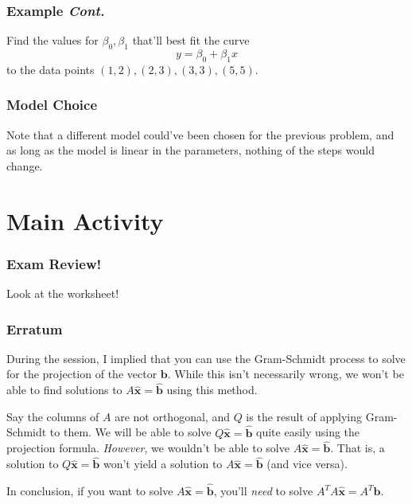 \documentclass{beamer}
\renewcommand{\vec}[1]{\mathbf{#1}}
\begin{document}
	\begin{frame}
		\frametitle{Example \textit{Cont.}}
		Find the values for \(\beta_0, \beta_1\) that'll best fit the curve \[y = \beta_0 + \beta_1 x\] to the data points \((1, 2), (2, 3), (3, 3), (5, 5)\).
		\begin{figure}[!h]
		\end{figure}
	\end{frame}

	\begin{frame}
		\frametitle{Model Choice}
		Note that a different model could've been chosen for the previous problem, and as long as the model is linear in the parameters, nothing of the steps would change.
	\end{frame}

	\section{Main Activity}
	\begin{frame}
		\frametitle{Exam Review!}
		Look at the worksheet!
	\end{frame}

	\begin{frame}
		\frametitle{Erratum}
		During the session, I implied that you can use the Gram-Schmidt process to solve for the projection of the vector \(\vec{b}.\) While this isn't 
		necessarily wrong, we won't be able to find solutions to \(A\vec{\hat{x}} = \vec{\hat{b}}\) using this method. 
		
		Say the columns of \(A\) are not orthogonal, and \(Q\) is the result of applying Gram-Schmidt to them. We will be able to solve 
		\(Q\vec{\hat{x}} = \vec{\hat{b}}\) quite easily using the projection formula. \emph{However}, we wouldn't be able to solve 
		\(A\vec{\hat{x}} = \vec{\hat{b}}\). That is, a solution to \(Q\vec{\hat{x}} = \vec{\hat{b}}\) won't yield a solution to 
		\(A\vec{\hat{x}} = \vec{\hat{b}}\) (and vice versa). 

		In conclusion, if you want to solve \(A\vec{\hat{x}} = \vec{\hat{b}}\), you'll \emph{need} to solve \(A^TA\vec{\hat{x}} = A^T\vec{b}\).
	\end{frame}
\end{document}
